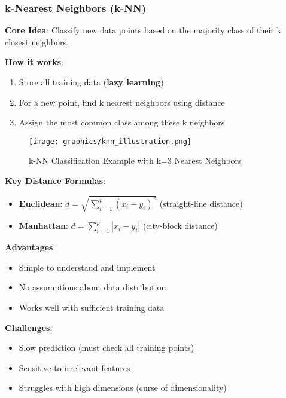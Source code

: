\subsubsection{k-Nearest Neighbors (k-NN)}
\textbf{Core Idea}: Classify new data points based on the majority class of their k closest neighbors.

\textbf{How it works}:
\begin{enumerate}
    \item Store all training data (\textbf{lazy learning})
    \item For a new point, find k nearest neighbors using distance
    \item Assign the most common class among these k neighbors
\end{enumerate}

\begin{figure}[h]
\centering
\vspace{0.3cm}
\texttt{[image: graphics/knn\_illustration.png]}
\vspace{0.4cm}
\caption{k-NN Classification Example with k=3 Nearest Neighbors}
\vspace{1cm}
\end{figure}

\textbf{Key Distance Formulas}:
\begin{itemize}
    \item \textbf{Euclidean}: $d = \sqrt{\sum_{i=1}^{p} (x_i - y_i)^2}$ (straight-line distance)
    \item \textbf{Manhattan}: $d = \sum_{i=1}^{p} |x_i - y_i|$ (city-block distance)
\end{itemize}

\textbf{Advantages}:
\begin{itemize}
    \item Simple to understand and implement
    \item No assumptions about data distribution
    \item Works well with sufficient training data
\end{itemize}

\textbf{Challenges}:
\begin{itemize}
    \item Slow prediction (must check all training points)
    \item Sensitive to irrelevant features
    \item Struggles with high dimensions (curse of dimensionality)
\end{itemize}

